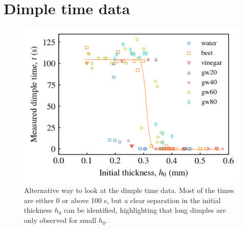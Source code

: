 \documentclass[aps,pre,onecolumn,superscriptaddress,notitlepage,10pt]{revtex4-2}
\begin{document}
\newpage

\section{Dimple time data}

\begin{figure}[ht]
    \centering
    \includegraphics[width=\linewidth]{Figures/all_dimple_time_data.png}
    \caption{
    Alternative way to look at the dimple time data. Most of the times are either 0 or above 100 s, but a clear separation in the initial thickness $h_0$ can be identified, highlighting that long dimples are only observed for small $h_0$.
    }
    \label{fig:all-dimple-time-data}
\end{figure}

\end{document}
